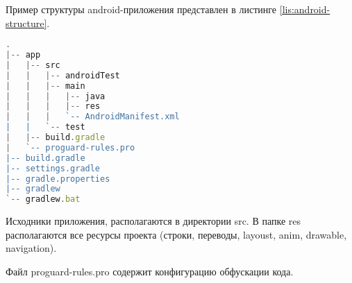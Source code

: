 Пример структуры android-приложения представлен в листинге \ref{lis:android-structure}.

\begin{minipage}{\textwidth}
    \begin{lstlisting}[language=TypeScript, captionpos=b,
        label={lis:android-structure},
        caption={Пример структуры Android приложения}
        ]
.
|-- app
|   |-- src
|   |   |-- androidTest
|   |   |-- main
|   |   |   |-- java
|   |   |   |-- res
|   |   |   `-- AndroidManifest.xml
|   |   `-- test
|   |-- build.gradle
|   `-- proguard-rules.pro
|-- build.gradle
|-- settings.gradle
|-- gradle.properties
|-- gradlew
`-- gradlew.bat
        \end{lstlisting}            
\end{minipage}

Исходники приложения, располагаются в директории src. В папке res располагаются все ресурсы проекта (строки, переводы, layoust, anim, drawable, navigation).

Файл proguard-rules.pro содержит конфигурацию обфускации кода.
